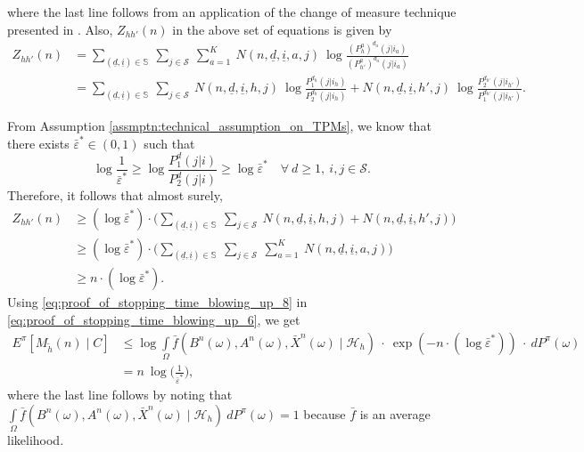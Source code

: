 where the last line follows from an application of the change of measure technique presented in \cite[Lemma 18]{Kaufmann2016}. Also,  $Z_{hh'}(n)$ in the above set of equations is given by
\begin{align}
	Z_{hh'}(n) &= \sum\limits_{(\underline{d}, \underline{i})\in \mathbb{S}}~\sum\limits_{j\in \mathcal{S}}~\sum\limits_{a=1}^{K} ~ N(n, \underline{d}, \underline{i}, a, j)~\log \frac{(P_h^a)^{d_a}(j|i_a)}{(P_{h'}^a)^{d_a}(j|i_a)}\nonumber\\
	&=\sum\limits_{(\underline{d}, \underline{i})\in \mathbb{S}}~\sum\limits_{j\in \mathcal{S}}~ N(n, \underline{d}, \underline{i}, h, j)~\log \frac{P_1^{d_h}(j|i_h)}{P_2^{d_h}(j|i_h)} + N(n, \underline{d}, \underline{i}, h', j)~\log \frac{P_2^{d_{h'}}(j|i_{h'})}{P_1^{d_{h'}}(j|i_{h'})}.
	\label{eq:Z_hh'(n)}
\end{align}

From Assumption \ref{assmptn:technical_assumption_on_TPMs}, we know that there exists $\bar{\varepsilon}^* \in (0,1)$ such that
\begin{equation}
	\log \frac{1}{\bar{\varepsilon}^*} \geq \log \frac{P_1^{d}(j|i)}{P_2^{d}(j|i)} \geq \log \bar{\varepsilon}^*\quad \forall~d\geq 1,~i,j\in \mathcal{S}.
	\label{eq:proof_of_stopping_time_blowing_up_7}
\end{equation}
Therefore, it follows that almost surely,
\begin{align}
	Z_{hh'}(n) &\geq (\log \bar{\varepsilon}^*) \cdot \bigg(\sum\limits_{(\underline{d}, \underline{i})\in \mathbb{S}}~\sum\limits_{j\in \mathcal{S}}~N(n, \underline{d}, \underline{i}, h, j)+N(n, \underline{d}, \underline{i}, h', j)\bigg)\nonumber\\
	&\geq (\log \bar{\varepsilon}^*)\cdot \bigg(\sum\limits_{(\underline{d}, \underline{i})\in \mathbb{S}}~\sum\limits_{j\in \mathcal{S}}~\sum\limits_{a=1}^{K}~N(n, \underline{d}, \underline{i}, a, j)\bigg)\\
	&\geq n\cdot (\log \bar{\varepsilon}^*).
	\label{eq:proof_of_stopping_time_blowing_up_8}
\end{align}
Using \eqref{eq:proof_of_stopping_time_blowing_up_8} in \eqref{eq:proof_of_stopping_time_blowing_up_6}, we get
\begin{align}
	E^\pi[M_{\tilde{h}}(n)\mid C]&\leq \log \int\limits_{\Omega}\bar{f}(B^n(\omega), A^n(\omega), \bar{X}^n(\omega) \mid \mathcal{H}_{h}) ~\cdot~\exp(-n\cdot (\log \bar{\varepsilon}^*))~\cdot ~dP^\pi(\omega)\nonumber\\
	 &= n~\log \bigg(\frac{1}{\bar{\varepsilon}^*}\bigg),
	 \label{eq:proof_of_stopping_time_blowing_up_case_1}
\end{align}
where the last line follows by noting that $\int\limits_{\Omega}\bar{f}(B^n(\omega), A^n(\omega), \bar{X}^n(\omega) \mid \mathcal{H}_{h})~dP^\pi(\omega)=1$ because $\bar{f}$ is an average likelihood.

